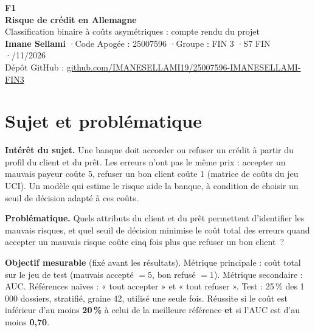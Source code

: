 \documentclass[10.5pt,a4paper]{article}
\newcommand{\pc}{\,\%}
\begin{document}
\begin{tcolorbox}[colback=navy,colframe=navy,arc=4pt,left=14pt,right=14pt,top=12pt,bottom=12pt]
{\color{accent}\bfseries\large F1}\\[2pt]
{\color{white}\bfseries\fontsize{22}{26}\selectfont Risque de crédit en Allemagne}\\[4pt]
{\color{white!80!navy}\large Classification binaire à coûts asymétriques : compte rendu du projet}\\[8pt]
{\color{white}\small\textbf{Imane Sellami} \quad·\quad Code Apogée : 25007596 \quad·\quad Groupe : FIN 3 \quad·\quad S7 FIN \quad·/11/2026}\\[2pt]
{\color{white!70!navy}\small Dépôt GitHub : \href{https://github.com/IMANESELLAMI19/25007596-IMANESELLAMI-FIN3.git}{\color{white!70!navy}github.com/IMANESELLAMI19/25007596-IMANESELLAMI-FIN3}}
\end{tcolorbox}

\section{Sujet et problématique}
\textbf{Intérêt du sujet.} Une banque doit accorder ou refuser un crédit à partir du profil du client et du prêt. Les erreurs n'ont pas le même prix : accepter un mauvais payeur coûte 5, refuser un bon client coûte 1 (matrice de coûts du jeu UCI). Un modèle qui estime le risque aide la banque, à condition de choisir un seuil de décision adapté à ces coûts.

\textbf{Problématique.} Quels attributs du client et du prêt permettent d'identifier les mauvais risques, et quel seuil de décision minimise le coût total des erreurs quand accepter un mauvais risque coûte cinq fois plus que refuser un bon client~?

\begin{encadre}
\textbf{Objectif mesurable} (fixé avant les résultats). Métrique principale : coût total sur le jeu de test (mauvais accepté $=5$, bon refusé $=1$). Métrique secondaire : AUC. Références naïves : « tout accepter » et « tout refuser ». Test : 25\pc{} des 1\,000 dossiers, stratifié, graine 42, utilisé une seule fois. Réussite si le coût est inférieur d'au moins \textbf{20\pc{}} à celui de la meilleure référence \textbf{et} si l'AUC est d'au moins \textbf{0,70}.
\end{encadre}
\end{document}
